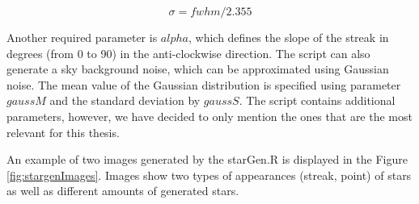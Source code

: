 \begin{equation}
  \sigma = fwhm / 2.355   
\end{equation}


Another required parameter is $alpha$, which defines the slope of the streak in degrees (from 0 to 90) in the anti-clockwise direction. %
The script can also generate a sky background noise, which can be approximated using Gaussian noise. The mean value of the Gaussian distribution is specified using parameter $gaussM$ and the standard deviation by $gaussS$. 
The script contains additional parameters, however, we have decided to only mention the ones that are the most relevant for this thesis. 

An example of two images generated by the starGen.R is displayed in the Figure \ref{fig:stargenImages}. Images show two types of appearances (streak, point) of stars as well as different amounts of generated stars. 

